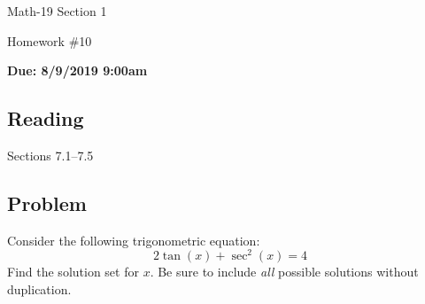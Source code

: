 \documentclass[letterpaper,12pt,fleqn]{article}
\begin{document}
\begin{center}
  \large
  Math-19 Section 1

  \Large
  Homework \#10

  \large
  \textbf{Due: 8/9/2019 9:00am}
\end{center}

\subsection*{Reading}

Sections 7.1--7.5

\subsection*{Problem}

Consider the following trigonometric equation:
\[2\tan(x)+\sec^2(x)=4\]
Find the solution set for \(x\).  Be sure to include \emph{all} possible solutions without duplication.
\end{document}
